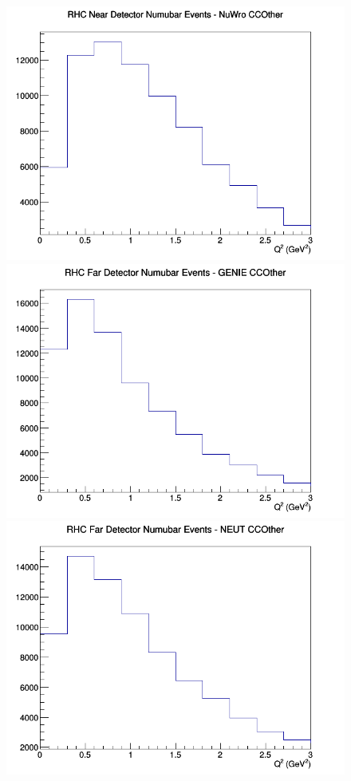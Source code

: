 \begin{figure}[h]
\includegraphics[width=\linewidth]{Q2/nominal/CCOther_RHC_ND_numubar_Q2_NuWro.png}
\endminipage
\newline
{}
\includegraphics[width=\linewidth]{Q2/nominal/CCOther_RHC_FD_numubar_Q2_GENIE.png}
\endminipage
{}
\includegraphics[width=\linewidth]{Q2/nominal/CCOther_RHC_FD_numubar_Q2_NEUT.png}

\end{figure}
